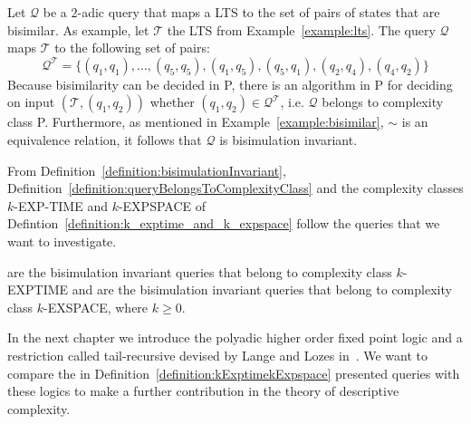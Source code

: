 \begin{example}{\cite{lange2014capturing}}
    \label{example:query_bisimulation}
    Let $\mathcal{Q}$ be a $2$-adic query that maps a LTS to the set of pairs of states that are bisimilar. As
    example, let $\mathcal{T}$ the LTS from Example~\ref{example:lts}. The query $\mathcal{Q}$ maps $\mathcal{T}$ to
    the following set of pairs:
    \[\mathcal{Q}^\mathcal{T} = \{(q_1, q_1), \dots, (q_5, q_5), (q_1, q_5), (q_5, q_1), (q_2, q_4), (q_4,
    q_2)\}\]
    Because bisimilarity can be decided in P, there is an algorithm in P for deciding on input $(\mathcal{T}, (q_1,
    q_2))$ whether $(q_1, q_2) \in \mathcal{Q}^\mathcal{T}$, i.e. $\mathcal{Q}$ belongs to complexity class P.
    Furthermore, as mentioned in Example~\ref{example:bisimilar}, $\sim$ is an
    equivalence relation, it follows that $\mathcal{Q}$ is bisimulation invariant.
\end{example}

From Definition~\ref{definition:bisimulationInvariant}, Definition~\ref{definition:queryBelongsToComplexityClass}
and the complexity classes $k$-EXP-TIME and $k$-EXPSPACE of Defintion~\ref{definition:k_exptime_and_k_expspace} follow
the queries that we want to investigate.

\begin{definition}
    \label{definition:kExptimekExpspace}
     are the bisimulation invariant queries that belong to complexity class $k$-EXPTIME and
     are the bisimulation invariant queries that belong to complexity class $k$-EXSPACE, where $k \geq 0$.
\end{definition}

In the next chapter we introduce the polyadic higher order fixed point logic and a restriction called tail-recursive
devised by Lange and Lozes in~\cite{lange2014capturing}. We want to compare the in
Definition~\ref{definition:kExptimekExpspace} presented queries with these logics to make a further contribution in
the theory of descriptive complexity.